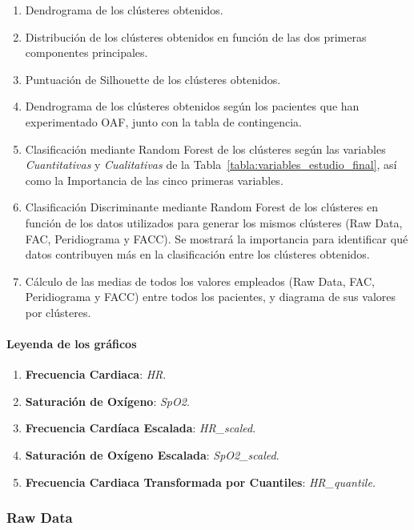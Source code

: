 \begin{enumerate}
    \item Dendrograma de los clústeres obtenidos.
    \item Distribución de los clústeres obtenidos en función de las dos primeras componentes principales.
    \item Puntuación de Silhouette de los clústeres obtenidos.
    \item Dendrograma de los clústeres obtenidos según los pacientes que han experimentado OAF, junto con la tabla de contingencia.
    \item Clasificación mediante Random Forest de los clústeres según las variables \textit{Cuantitativas} y \textit{Cualitativas} de la Tabla~\ref{tabla:variables_estudio_final}, así como la Importancia de las cinco primeras variables.
    \item Clasificación Discriminante mediante Random Forest de los clústeres en función de los datos utilizados para generar los mismos clústeres (Raw Data, FAC, Peridiograma y FACC). Se mostrará la importancia para identificar qué datos contribuyen más en la clasificación entre los clústeres obtenidos.
    \item Cálculo de las medias de todos los valores empleados (Raw Data, FAC, Peridiograma y FACC) entre todos los pacientes, y diagrama de sus valores por clústeres.
\end{enumerate}

\paragraph{Leyenda de los gráficos}

\begin{enumerate}
    \item \textbf{Frecuencia Cardiaca}: \textit{HR}.
    \item \textbf{Saturación de Oxígeno}: \textit{SpO2}.
    \item \textbf{Frecuencia Cardíaca Escalada}: \textit{HR\_scaled}.
    \item \textbf{Saturación de Oxígeno Escalada}: \textit{SpO2\_scaled}.
    \item \textbf{Frecuencia Cardiaca Transformada por Cuantiles}: \textit{HR\_quantile}.
\end{enumerate}


\subsubsection{Raw Data}

